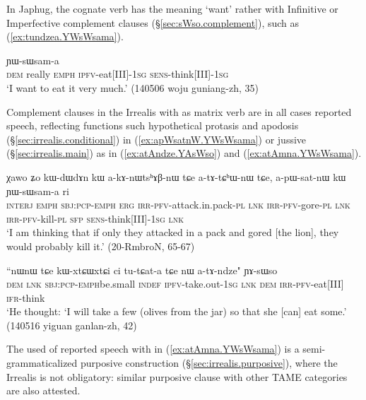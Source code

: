 In Japhug, the cognate verb  has the meaning `want' rather with Infinitive or Imperfective complement clauses (§\ref{sec:sWso.complement}), such as (\ref{ex:tundzea.YWsWsama}).

\begin{exe}
\ex \label{ex:tundzea.YWsWsama}
 ɲɯ-sɯsam-a \\
\textsc{dem} really \textsc{emph} \textsc{ipfv}-eat[III]-\textsc{1sg} \textsc{sens}-think[III]-\textsc{1sg} \\
\glt `I want to eat it very much.' (140506 woju guniang-zh, 35)
\end{exe}

Complement clauses in the Irrealis with  as matrix verb are in all cases reported speech, reflecting functions such  hypothetical protasis and apodosis (§\ref{sec:irrealis.conditional}) in (\ref{ex:apWsatnW.YWsWsama}) or jussive (§\ref{sec:irrealis.main}) as in (\ref{ex:atAndze.YAsWso}) and (\ref{ex:atAmna.YWsWsama}). 

\begin{exe}
\ex \label{ex:apWsatnW.YWsWsama}
\gll  χawo ʑo kɯ-dɯ\redp{}dɤn kɯ a-kɤ-nɯtsʰɤβ-nɯ tɕe a-tɤ-tɕʰɯ-nɯ tɕe, a-pɯ-sat-nɯ kɯ ɲɯ-sɯsam-a ri \\
\textsc{interj} \textsc{emph} \textsc{sbj}:\textsc{pcp}-\textsc{emph}\redp{} \textsc{erg} \textsc{irr}-\textsc{pfv}-attack.in.pack-\textsc{pl} \textsc{lnk} \textsc{irr}-\textsc{pfv}-gore-\textsc{pl} \textsc{lnk} \textsc{irr}-\textsc{pfv}-kill-\textsc{pl} \textsc{sfp} \textsc{sens}-think[III]-\textsc{1sg} \textsc{lnk} \\
\glt `I am thinking that if only they attacked in a pack and gored [the lion], they would probably kill it.' (20-RmbroN, 65-67)
\end{exe}


\begin{exe}
\ex \label{ex:atAndze.YAsWso}
\gll ``nɯnɯ tɕe kɯ-xtɕɯ\redp{}xtɕi ci tu-tɕat-a tɕe nɯ a-tɤ-ndze" ɲɤ-sɯso \\
\textsc{dem} \textsc{lnk} \textsc{sbj}:\textsc{pcp}-\textsc{emph}\redp{}be.small \textsc{indef} \textsc{ipfv}-take.out-\textsc{1sg} \textsc{lnk} \textsc{dem} \textsc{irr}-\textsc{pfv}-eat[III] \textsc{ifr}-think \\
\glt `He thought: `I will take a few (olives from the jar) so that she [can] eat some.' (140516 yiguan ganlan-zh, 42)
\end{exe}


The used of reported speech with  in (\ref{ex:atAmna.YWsWsama}) is a semi-grammaticalized purposive construction (§\ref{sec:irrealis.purposive}), where the Irrealis is not obligatory: similar purposive clause with other TAME categories are also attested.

